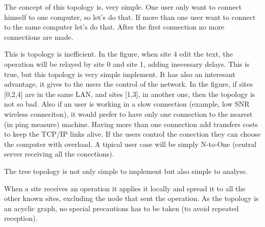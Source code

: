 \documentclass{report}
\begin{document}
The concept of this topology is, very simple. One user only want to connect himself to one computer, so let's do that. If more than one user want to connect to the same computer let's do that. After the first connection no more connections are made.

This is topology is inefficient. In the figure, when site 4 edit the text, the operation will be relayed by site 0 and site 1, adding inecessary delays. This is true, but this topology is very simple implement. It has also an interesant advantage, it gives to the users the control of the network. In the figure, if sites [0,2,4] are in the same LAN, and sites [1,3], in another one, then the topology is not so bad. Also if an user is working in a slow connection (example, low SNR wireless conneciton), it would prefer to have only one connection to the nearest (in ping measure) machine. Having more than one connection add transfers costs to keep the TCP/IP links alive. If the users control the conection they can choose the computer with overload. A tipical user case will be simply N-to-One (central server receiving all the conections).
 
The tree topology is not only simple to implement but also simple to analyse.
    
When a site receives an operation it applies it locally and spread it to all the other known sites, excluding the node that sent the operation. As the topology is an acyclic graph, no special precautions has to be taken (to avoid repeated reception).
\end{document}

